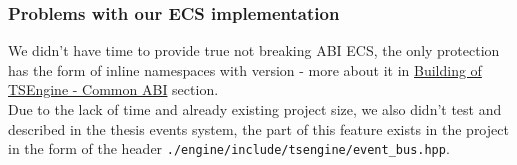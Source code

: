 \newpage
\subsubsection{Problems with our ECS implementation}
We didn't have time to provide true not breaking ABI ECS, the only protection has the form of inline namespaces with version - more about it in \hyperref[sec:abi]{Building of TSEngine - Common ABI} section.\\
Due to the lack of time and already existing project size, we also didn't test and described in the thesis events system, the part of this feature exists in the project in the form of the header \texttt{./engine/include/tsengine/event_bus.hpp}.

\newpage